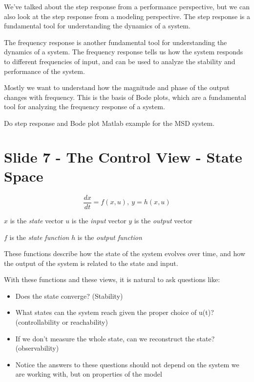 \documentclass[
  letterpaper,
  DIV=11,
  numbers=noendperiod]{scrreprt}
\begin{document}
We've talked about the step response from a performance perspective, but
we can also look at the step response from a modeling perspective. The
step response is a fundamental tool for understanding the dynamics of a
system.

The frequency response is another fundamental tool for understanding the
dynamics of a system. The frequency response tells us how the system
responds to different frequencies of input, and can be used to analyze
the stability and performance of the system.

Mostly we want to understand how the magnitude and phase of the output
changes with frequency. This is the basis of Bode plots, which are a
fundamental tool for analyzing the frequency response of a system.

\begin{tcolorbox}[enhanced jigsaw, arc=.35mm, bottomrule=.15mm, bottomtitle=1mm, breakable, colback=white, colbacktitle=quarto-callout-note-color!10!white, colframe=quarto-callout-note-color-frame, coltitle=black, left=2mm, leftrule=.75mm, opacityback=0, opacitybacktitle=0.6, rightrule=.15mm, title=\textcolor{quarto-callout-note-color}{\faInfo}\hspace{0.5em}{Note}, titlerule=0mm, toprule=.15mm, toptitle=1mm]

Do step response and Bode plot Matlab example for the MSD system.

\end{tcolorbox}

\section{Slide 7 - The Control View - State
Space}\label{slide-7---the-control-view---state-space}

\[ \frac{dx}{dt} = f(x, u), \ y = h(x, u) \]

\(x\) is the \emph{state} vector \(u\) is the \emph{input} vector \(y\)
is the \emph{output} vector

\(f\) is the \emph{state function} \(h\) is the \emph{output function}

These functions describe how the state of the system evolves over time,
and how the output of the system is related to the state and input.

With these functions and these views, it is natural to ask questions
like:

\begin{itemize}
\item
  Does the state converge? (Stability)
\item
  What states can the system reach given the proper choice of u(t)?
  (controllability or reachability)
\item
  If we don't measure the whole state, can we reconstruct the state?
  (observability)
\item
  Notice the answers to these questions should not depend on the system
  we are working with, but on properties of the model
\end{itemize}
\end{document}
